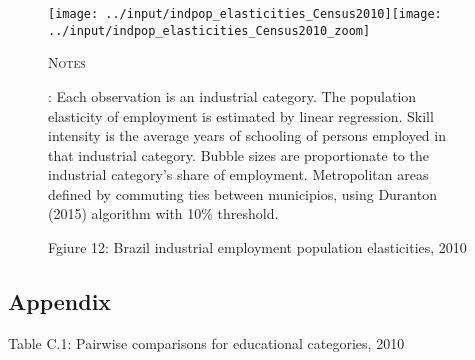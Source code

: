 \documentclass[11pt]{article}
\begin{document}
\begin{figure}[hp]
\caption{Fgiure 12: Brazil industrial employment population elasticities, 2010\label{fig:Brazil-ind-elasticities}}
\begin{centering}
\texttt{[image: ../input/indpop\_elasticities\_Census2010]}\texttt{[image: ../input/indpop\_elasticities\_Census2010\_zoom]}
\par\end{centering}
\centering{}%
\begin{minipage}[t]{0.85\textwidth}%
\textsc{\footnotesize{}Notes}{\footnotesize{}:
Each observation is an industrial category.
The population elasticity of employment is estimated by linear regression.
Skill intensity is the average years of schooling of persons employed in that industrial category.
Bubble sizes are proportionate to the industrial category's share of employment.
Metropolitan areas defined by commuting ties between municipios, using Duranton (2015) algorithm with 10\% threshold.\par}%
\end{minipage}
\end{figure}

\subsection*{Appendix}



\begin{table} \caption*{Table C.1: Pairwise comparisons for educational categories, 2010} \begin{center}

\label{tab:edu_pairwise}
\end{center}\end{table}
\end{document}
